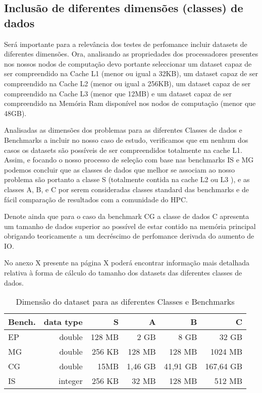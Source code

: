 \documentclass[conference,compsoc]{IEEEtran}
\begin{document}
\subsection{Inclusão de diferentes dimensões (classes) de dados}

Será importante para a relevância dos testes de perfomance incluir datasets de diferentes dimensões. Ora, analisando as propriedades dos processadores presentes nos nossos nodos de computação devo portante seleccionar um dataset capaz de ser compreendido na Cache L1 (menor ou igual a 32KB), um dataset capaz de ser compreendido na Cache L2 (menor ou igual a 256KB), um dataset capaz de ser compreendido na Cache L3 (menor que 12MB) e um dataset capaz de ser compreendido na Memória Ram disponível nos nodos de computação (menor que 48GB). \par 
Analisadas as dimensões dos problemas para as diferentes Classes de dados e Benchmarks a incluir no nosso caso de estudo, verificamos que em nenhum dos casos os datasets são possíveis de ser compreendidos totalmente na cache L1. Assim, e focando o nosso processo de seleção com base nas benchmarks IS e MG podemos concluir que as classes de dados que melhor se associam ao nosso problema são portanto a classe S (totalmente contida na cache L2 ou L3 ), e as classes A, B, e C por serem consideradas classes standard das benchmarks e de fácil comparação de resultados com a comunidade do HPC. \par 
Denote ainda que para o caso da benchmark CG a classe de dados C apresenta um tamanho de dados superior ao possível de estar contido na memória principal obrigando teoricamente a um decréscimo de perfomance derivada do aumento de IO.\par 
No anexo X presente na página X poderá encontrar informação mais detalhada relativa à forma de cálculo do tamanho dos datasets das diferentes classes de dados. 

\begin{table}[h!]
\caption{Dimensão do dataset para as diferentes Classes e Benchmarks}
     \label{table:dimensaoproblema}
\centering
  \begin{tabular}{ | l | r |  r | r | r | r |  }
  
    \hline
    Bench. & data type & S & A & B & C \\ \hline 
    
     EP &  double & 128	MB & 2	GB	 & 8	GB	& 32	GB \\ \hline 
     
  MG &  double &   256	KB & 128	MB	& 128	MB	& 1024	MB \\ \hline 
    CG & double & 15MB & 1,46	GB& 41,91	GB	& 167,64	GB \\ \hline 
    IS & integer & 256	KB & 32	MB	& 128	MB	& 512	MB \\ \hline 

  \end{tabular}
\end{table}
\end{document}
